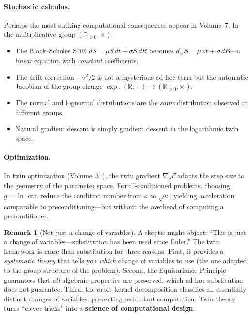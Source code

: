 \documentclass[11pt,a4paper,openany]{book}
\theoremstyle{plain}
\theoremstyle{definition}
\newtheorem{remark}[theorem]{Remark}
\newcommand{\RR}{\mathbb{R}}
\begin{document}
\paragraph{Stochastic calculus.} Perhaps the most striking computational consequences appear in Volume~7. In the multiplicative group $(\RR_{>0}, \times)$:
\begin{itemize}
\item The Black--Scholes SDE $dS = \mu S \, dt + \sigma S \, dB$ becomes $d_\times S = \mu \, dt + \sigma \, dB$---a \emph{linear} equation with \emph{constant} coefficients.
\item The drift correction $-\sigma^2/2$ is not a mysterious ad hoc term but the automatic Jacobian of the group change $\exp : (\RR, +) \to (\RR_{>0}, \times)$.
\item The normal and lognormal distributions are the \emph{same} distribution observed in different groups.
\item Natural gradient descent is simply gradient descent in the logarithmic twin space.
\end{itemize}

\paragraph{Optimization.} In twin optimization (Volume~3~\cite{Vol03}), the twin gradient $\nabla_g F$ adapts the step size to the geometry of the parameter space. For ill-conditioned problems, choosing $g = \ln$ can reduce the condition number from $\kappa$ to $\sqrt{\kappa}$, yielding acceleration comparable to preconditioning---but without the overhead of computing a preconditioner.

\begin{remark}[Not just a change of variables]
A skeptic might object: ``This is just a change of variables---substitution has been used since Euler.'' The twin framework is more than substitution for three reasons. First, it provides a \emph{systematic theory} that tells you \emph{which} change of variables to use (the one adapted to the group structure of the problem). Second, the Equivariance Principle guarantees that \emph{all} algebraic properties are preserved, which ad hoc substitution does not guarantee. Third, the orbit--kernel decomposition classifies all essentially distinct changes of variables, preventing redundant computation. Twin theory turns ``clever tricks'' into a \textbf{science of computational design}.
\end{remark}
\end{document}
